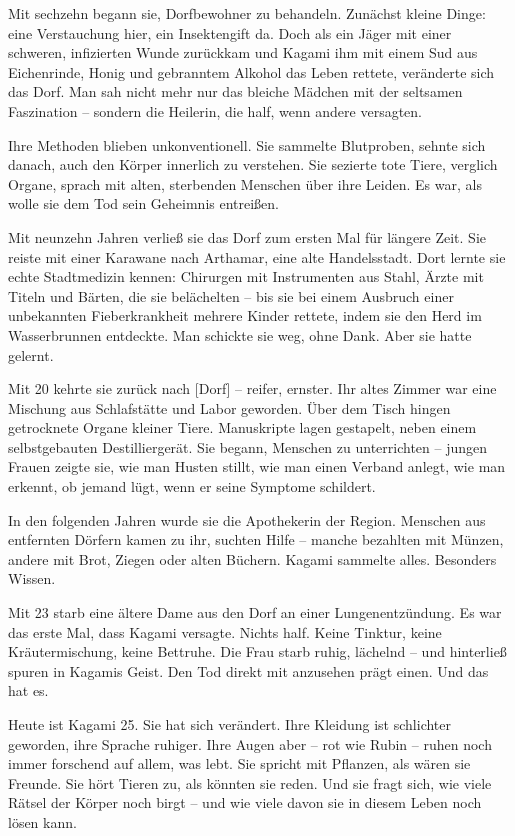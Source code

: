 \documentclass[12pt,a4paper]{article}
\begin{document}
Mit sechzehn begann sie, Dorfbewohner zu behandeln. Zunächst kleine Dinge: eine Verstauchung hier, ein Insektengift da. Doch als ein Jäger mit einer schweren, infizierten Wunde zurückkam und Kagami ihm mit einem Sud aus Eichenrinde, Honig und gebranntem Alkohol das Leben rettete, veränderte sich das Dorf. Man sah nicht mehr nur das bleiche Mädchen mit der seltsamen Faszination – sondern die Heilerin, die half, wenn andere versagten.

Ihre Methoden blieben unkonventionell. Sie sammelte Blutproben, sehnte sich danach, auch den Körper innerlich zu verstehen. Sie sezierte tote Tiere, verglich Organe, sprach mit alten, sterbenden Menschen über ihre Leiden. Es war, als wolle sie dem Tod sein Geheimnis entreißen.

Mit neunzehn Jahren verließ sie das Dorf zum ersten Mal für längere Zeit. Sie reiste mit einer Karawane nach Arthamar, eine alte Handelsstadt. Dort lernte sie echte Stadtmedizin kennen: Chirurgen mit Instrumenten aus Stahl, Ärzte mit Titeln und Bärten, die sie belächelten – bis sie bei einem Ausbruch einer unbekannten Fieberkrankheit mehrere Kinder rettete, indem sie den Herd im Wasserbrunnen entdeckte. Man schickte sie weg, ohne Dank. Aber sie hatte gelernt.

Mit 20 kehrte sie zurück nach [Dorf] – reifer, ernster. Ihr altes Zimmer war eine Mischung aus Schlafstätte und Labor geworden. Über dem Tisch hingen getrocknete Organe kleiner Tiere. Manuskripte lagen gestapelt, neben einem selbstgebauten Destilliergerät. Sie begann, Menschen zu unterrichten – jungen Frauen zeigte sie, wie man Husten stillt, wie man einen Verband anlegt, wie man erkennt, ob jemand lügt, wenn er seine Symptome schildert.

In den folgenden Jahren wurde sie die Apothekerin der Region. Menschen aus entfernten Dörfern kamen zu ihr, suchten Hilfe – manche bezahlten mit Münzen, andere mit Brot, Ziegen oder alten Büchern. Kagami sammelte alles. Besonders Wissen.

Mit 23 starb eine ältere Dame aus den Dorf an einer Lungenentzündung. Es war das erste Mal, dass Kagami versagte. Nichts half. Keine Tinktur, keine Kräutermischung, keine Bettruhe. Die Frau starb ruhig, lächelnd – und hinterließ spuren in Kagamis Geist. Den Tod direkt mit anzusehen prägt einen. Und das hat es.

Heute ist Kagami 25. Sie hat sich verändert. Ihre Kleidung ist schlichter geworden, ihre Sprache ruhiger. Ihre Augen aber – rot wie Rubin – ruhen noch immer forschend auf allem, was lebt. Sie spricht mit Pflanzen, als wären sie Freunde. Sie hört Tieren zu, als könnten sie reden. Und sie fragt sich, wie viele Rätsel der Körper noch birgt – und wie viele davon sie in diesem Leben noch lösen kann.
\end{document}
